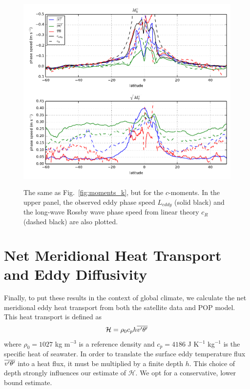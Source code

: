 \documentclass[10pt]{article}
\newcommand{\ol}{\ensuremath{\overline}}
\begin{document}
\begin{figure}[t]
  \noindent\includegraphics{../figures/moments_c.pdf}\\
  \caption{The same as Fig.~\ref{fig:moments_k}, but for the $c$-moments. In the upper panel, the observed eddy phase speed $L_{eddy}$ (solid black) and the long-wave Rossby wave phase speed from linear theory $c_R$ (dashed black) are also plotted. }
  \label{fig:moments_c}
\end{figure}

\section{Net Meridional Heat Transport and Eddy Diffusivity}

Finally, to put these results in the context of global climate, we calculate the net meridional eddy heat transport from both the satellite data and POP model. This heat transport is defined as
\begin{equation}
\mathcal{H} = \rho_0 c_p h \ol{v'\theta'}
\label{eq:H}
\end{equation}
where $\rho_0 = 1027$ kg m$^{-3}$ is a reference density and $c_p = 4186$ J K$^{-1}$ kg$^{-1}$ is the specific heat of seawater. In order to translate the surface eddy temperature flux $\ol{v'\theta'}$ into a heat flux, it must be multiplied by a finite depth $h$. This choice of depth strongly influences our estimate of $\mathcal{H}$. We opt for a conservative, lower bound estimate.
\end{document}

